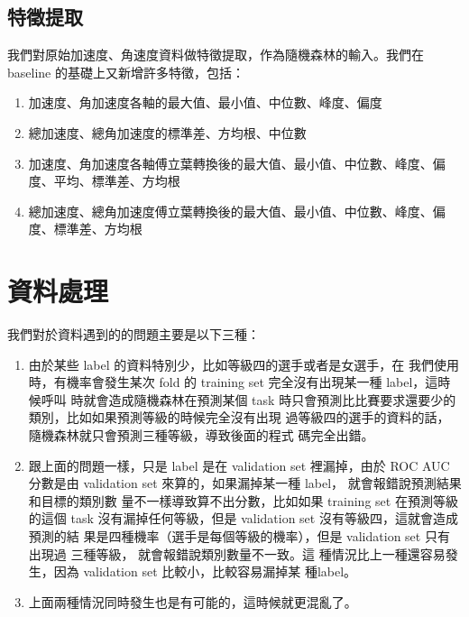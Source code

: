 \documentclass[12pt, a4paper]{article}
\begin{document}
        \subsection{特徵提取}
            我們對原始加速度、角速度資料做特徵提取，作為隨機森林的輸入。我們在
            baseline 的基礎上又新增許多特徵，包括：
            \begin{enumerate}
                \item 加速度、角加速度各軸的最大值、最小值、中位數、峰度、偏度
                \item 總加速度、總角加速度的標準差、方均根、中位數
                \item 加速度、角加速度各軸傅立葉轉換後的最大值、最小值、中位數、峰度、偏度、平均、標準差、方均根
                \item 總加速度、總角加速度傅立葉轉換後的最大值、最小值、中位數、峰度、偏度、標準差、方均根
            \end{enumerate}
    \section{資料處理\label{data-processing}}
        我們對於資料遇到的的問題主要是以下三種：
        \begin{enumerate}
            \item 由於某些 label 的資料特別少，比如等級四的選手或者是女選手，在
            我們使用  時，有機率會發生某次 fold 的 training set
            完全沒有出現某一種 label，這時候呼叫
             時就會造成隨機森林在預測某個 task
            時只會預測比比賽要求還要少的類別，比如如果預測等級的時候完全沒有出現
            過等級四的選手的資料的話，隨機森林就只會預測三種等級，導致後面的程式
            碼完全出錯。

            \item 跟上面的問題一樣，只是 label 是在 validation set 裡漏掉，由於
            ROC AUC 分數是由 validation set 來算的，如果漏掉某一種
            label， 就會報錯說預測結果和目標的類別數
            量不一樣導致算不出分數，比如如果 training set 在預測等級的這個 task
            沒有漏掉任何等級，但是 validation set 沒有等級四，這就會造成預測的結
            果是四種機率（選手是每個等級的機率），但是 validation set 只有出現過
            三種等級， 就會報錯說類別數量不一致。這
            種情況比上一種還容易發生，因為 validation set 比較小，比較容易漏掉某
            種label。
            
            \item 上面兩種情況同時發生也是有可能的，這時候就更混亂了。
        \end{enumerate}
\end{document}
